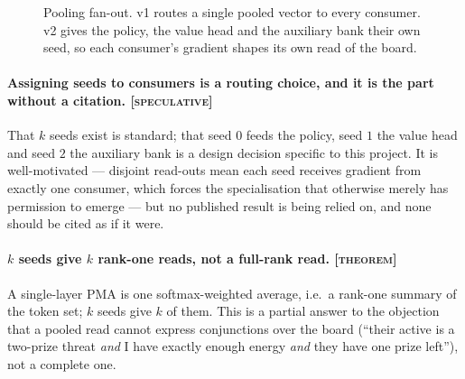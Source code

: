 \documentclass[11pt,a4paper]{article}
\newcommand{\tagT}{\textsc{[theorem]}}
\newcommand{\tagS}{\textcolor{cBad}{\textsc{[speculative]}}}
\begin{document}
\begin{figure}[h]
\centering
{}
\caption{Pooling fan-out. v1 routes a single pooled vector to every consumer.
v2 gives the policy, the value head and the auxiliary bank their own seed, so
each consumer's gradient shapes its own read of the board.}
\label{fig:pma}
\end{figure}

\paragraph{Assigning seeds to consumers is a routing choice, and it is the part
without a citation. \tagS}
That $k$ seeds exist is standard; that seed $0$ feeds the policy, seed $1$ the
value head and seed $2$ the auxiliary bank is a design decision specific to this
project. It is well-motivated --- disjoint read-outs mean each seed receives
gradient from exactly one consumer, which forces the specialisation that
otherwise merely has permission to emerge --- but no published result is being
relied on, and none should be cited as if it were.

\paragraph{$k$ seeds give $k$ rank-one reads, not a full-rank read. \tagT}
A single-layer PMA is one softmax-weighted average, i.e.\ a rank-one summary of
the token set; $k$ seeds give $k$ of them. This is a partial answer to the
objection that a pooled read cannot express conjunctions over the board
(``their active is a two-prize threat \emph{and} I have exactly enough energy
\emph{and} they have one prize left''), not a complete one.
\end{document}
